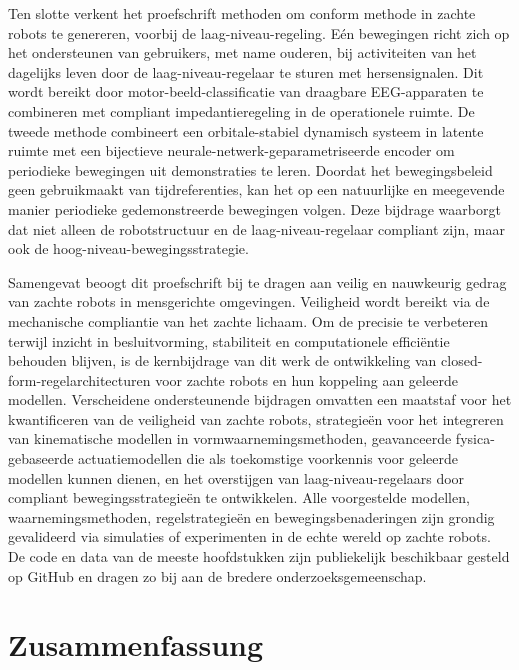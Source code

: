 {Ten slotte verkent het proefschrift methoden om conform methode in zachte robots te genereren, voorbij de laag-niveau-regeling. Eén bewegingen richt zich op het ondersteunen van gebruikers, met name ouderen, bij activiteiten van het dagelijks leven door de laag-niveau-regelaar te sturen met hersensignalen. Dit wordt bereikt door motor-beeld-classificatie van draagbare EEG-apparaten te combineren met compliant impedantieregeling in de operationele ruimte. De tweede methode combineert een orbitale-stabiel dynamisch systeem in latente ruimte met een bijectieve neurale-netwerk-geparametriseerde encoder om periodieke bewegingen uit demonstraties te leren. Doordat het bewegingsbeleid geen gebruikmaakt van tijdreferenties, kan het op een natuurlijke en meegevende manier periodieke gedemonstreerde bewegingen volgen. Deze bijdrage waarborgt dat niet alleen de robotstructuur en de laag-niveau-regelaar compliant zijn, maar ook de hoog-niveau-bewegingsstrategie.

Samengevat beoogt dit proefschrift bij te dragen aan veilig en nauwkeurig gedrag van zachte robots in mensgerichte omgevingen. Veiligheid wordt bereikt via de mechanische compliantie van het zachte lichaam. Om de precisie te verbeteren terwijl inzicht in besluitvorming, stabiliteit en computationele efficiëntie behouden blijven, is de kernbijdrage van dit werk de ontwikkeling van closed-form-regelarchitecturen voor zachte robots en hun koppeling aan geleerde modellen. Verscheidene ondersteunende bijdragen omvatten een maatstaf voor het kwantificeren van de veiligheid van zachte robots, strategieën voor het integreren van kinematische modellen in vormwaarnemingsmethoden, geavanceerde fysica-gebaseerde actuatiemodellen die als toekomstige voorkennis voor geleerde modellen kunnen dienen, en het overstijgen van laag-niveau-regelaars door compliant bewegingsstrategieën te ontwikkelen. Alle voorgestelde modellen, waarnemingsmethoden, regelstrategieën en bewegingsbenaderingen zijn grondig gevalideerd via simulaties of experimenten in de echte wereld op zachte robots. De code en data van de meeste hoofdstukken zijn publiekelijk beschikbaar gesteld op GitHub en dragen zo bij aan de bredere onderzoeksgemeenschap.
}

\chapter*{Zusammenfassung}

